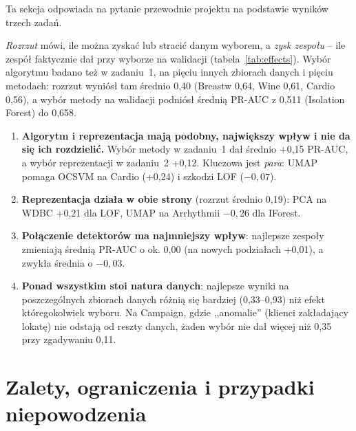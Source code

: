 \documentclass[11pt,a4paper]{article}
\begin{document}
Ta sekcja odpowiada na pytanie przewodnie projektu na podstawie wyników
trzech zadań.

\begin{table}[H]
  \centering\small
  \caption{Wpływ czynników na PR-AUC (test). Rozrzut -- różnica między
  najlepszym a najgorszym wyborem (algorytmu w danych oryginalnych; średnio
  dla jednego detektora między reprezentacjami); zysk zespołu -- względem
  najlepszego pojedynczego detektora wybranego na walidacji.}
  \label{tab:effects}
\end{table}

\emph{Rozrzut} mówi, ile można zyskać lub stracić danym wyborem, a
\emph{zysk zespołu} -- ile zespół faktycznie dał przy wyborze na walidacji
(tabela~\ref{tab:effects}). Wybór algorytmu badano też w zadaniu~1, na
pięciu innych zbiorach danych i pięciu metodach: rozrzut wyniósł tam średnio
0,40 (Breastw 0,64, Wine 0,61, Cardio 0,56), a wybór metody na walidacji
podniósł średnią PR-AUC z 0,511 (Isolation Forest) do 0,658.

\begin{enumerate}
  \item \textbf{Algorytm i reprezentacja mają podobny, największy wpływ i nie
  da się ich rozdzielić.} Wybór metody w zadaniu~1 dał średnio +0,15 PR-AUC,
  a wybór reprezentacji w zadaniu~2 +0,12. Kluczowa jest \emph{para}: UMAP
  pomaga OCSVM na Cardio (+0,24) i szkodzi LOF ($-0{,}07$).
  \item \textbf{Reprezentacja działa w obie strony} (rozrzut średnio 0,19):
  PCA na WDBC +0,21 dla LOF, UMAP na Arrhythmii $-0{,}26$ dla IForest.
  \item \textbf{Połączenie detektorów ma najmniejszy wpływ}: najlepsze zespoły
  zmieniają średnią PR-AUC o ok. 0,00 (na nowych podziałach +0,01), a zwykła
  średnia o $-0{,}03$.
  \item \textbf{Ponad wszystkim stoi natura danych}: najlepsze wyniki
  na poszczególnych zbiorach danych różnią się bardziej (0,33--0,93) niż
  efekt któregokolwiek wyboru. Na Campaign, gdzie ,,anomalie'' (klienci
  zakładający lokatę) nie odstają od reszty danych, żaden wybór nie dał
  więcej niż 0,35 przy zgadywaniu 0,11.
\end{enumerate}

\FloatBarrier
\section{Zalety, ograniczenia i przypadki niepowodzenia}
\label{sec:fail}
\end{document}
